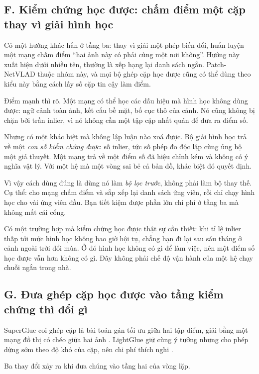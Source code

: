 \documentclass[../../deep_learning.tex]{subfiles}
\begin{document}
\subsection{F. Kiểm chứng học được: chấm điểm một cặp thay vì giải hình học}
Có một hướng khác hẳn ở tầng ba: thay vì giải một phép biến đổi, huấn luyện một mạng chấm điểm ``hai ảnh này có phải cùng một nơi không''. Hướng này xuất hiện dưới nhiều tên, thường là xếp hạng lại danh sách ngắn. Patch-NetVLAD thuộc nhóm này, và mọi bộ ghép cặp học được cũng có thể dùng theo kiểu này bằng cách lấy số cặp tin cậy làm điểm.

Điểm mạnh thì rõ. Một mạng có thể học các dấu hiệu mà hình học không dùng được: ngữ cảnh toàn ảnh, kết cấu bề mặt, bố cục thô của cảnh. Nó cũng không bị chặn bởi trần inlier, vì nó không cần một tập cặp nhất quán để đưa ra điểm số.

Nhưng có một khác biệt mà không lập luận nào xoá được. Bộ giải hình học trả về một \emph{con số kiểm chứng được}: số inlier, tức số phép đo độc lập cùng ủng hộ một giả thuyết. Một mạng trả về một điểm số đã hiệu chỉnh kém và không có ý nghĩa vật lý. Với một hệ mà một vòng sai bẻ cả bản đồ, khác biệt đó quyết định.

Vì vậy cách dùng đúng là dùng nó làm \emph{bộ lọc trước}, không phải làm bộ thay thế. Cụ thể: cho mạng chấm điểm và sắp xếp lại danh sách ứng viên, rồi chỉ chạy hình học cho vài ứng viên đầu. Bạn tiết kiệm được phần lớn chi phí ở tầng ba mà không mất cái cổng.

Có một trường hợp mà kiểm chứng học được thật sự cần thiết: khi tỉ lệ inlier thấp tới mức hình học không bao giờ hội tụ, chẳng hạn đi lại sau sáu tháng ở cảnh ngoài trời đổi mùa. Ở đó hình học không có gì để làm việc, nên một điểm số học được vẫn hơn không có gì. Đây không phải chế độ vận hành của một hệ chạy chuỗi ngắn trong nhà.

\subsection{G. Đưa ghép cặp học được vào tầng kiểm chứng thì đổi gì}
SuperGlue coi ghép cặp là bài toán gán tối ưu giữa hai tập điểm, giải bằng một mạng đồ thị có  chéo giữa hai ảnh \cite{f29sarlin2020superglue}. LightGlue giữ cùng ý tưởng nhưng cho phép dừng sớm theo độ khó của cặp, nên chi phí thích nghi \cite{f29lindenberger2023lightglue}.

Ba thay đổi xảy ra khi đưa chúng vào tầng hai của vòng lặp.
\end{document}
